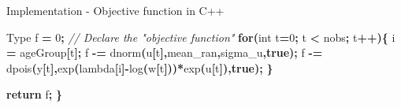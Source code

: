 \documentclass[aspectratio=169]{beamer}
\newenvironment{Shaded}{\begin{snugshade}}{\end{snugshade}}
\newcommand{\CommentTok}[1]{\textcolor[rgb]{0.56,0.35,0.01}{\textit{#1}}}
\newcommand{\ControlFlowTok}[1]{\textcolor[rgb]{0.13,0.29,0.53}{\textbf{#1}}}
\newcommand{\DataTypeTok}[1]{\textcolor[rgb]{0.13,0.29,0.53}{#1}}
\newcommand{\DecValTok}[1]{\textcolor[rgb]{0.00,0.00,0.81}{#1}}
\newcommand{\KeywordTok}[1]{\textcolor[rgb]{0.13,0.29,0.53}{\textbf{#1}}}
\newcommand{\NormalTok}[1]{#1}
\newcommand{\OperatorTok}[1]{\textcolor[rgb]{0.81,0.36,0.00}{\textbf{#1}}}
\begin{document}
\begin{frame}[fragile]{Implementation - Objective function in C++}
\begin{Shaded}
\begin{Highlighting}[]
\NormalTok{  Type f }\OperatorTok{=} \DecValTok{0}\OperatorTok{;}                           \CommentTok{// Declare the "objective function"}
  \ControlFlowTok{for}\OperatorTok{(}\DataTypeTok{int}\NormalTok{ t}\OperatorTok{=}\DecValTok{0}\OperatorTok{;}\NormalTok{ t }\OperatorTok{\textless{}}\NormalTok{ nobs}\OperatorTok{;}\NormalTok{ t}\OperatorTok{++)\{}
\NormalTok{    i }\OperatorTok{=}\NormalTok{ ageGroup}\OperatorTok{[}\NormalTok{t}\OperatorTok{];}
\NormalTok{    f }\OperatorTok{{-}=}\NormalTok{ dnorm}\OperatorTok{(}\NormalTok{u}\OperatorTok{[}\NormalTok{t}\OperatorTok{],}\NormalTok{mean\_ran}\OperatorTok{,}\NormalTok{sigma\_u}\OperatorTok{,}\KeywordTok{true}\OperatorTok{);}
\NormalTok{    f }\OperatorTok{{-}=}\NormalTok{ dpois}\OperatorTok{(}\NormalTok{y}\OperatorTok{[}\NormalTok{t}\OperatorTok{],}\NormalTok{exp}\OperatorTok{(}\NormalTok{lambda}\OperatorTok{[}\NormalTok{i}\OperatorTok{]{-}}\NormalTok{log}\OperatorTok{(}\NormalTok{w}\OperatorTok{[}\NormalTok{t}\OperatorTok{]))*}\NormalTok{exp}\OperatorTok{(}\NormalTok{u}\OperatorTok{[}\NormalTok{t}\OperatorTok{]),}\KeywordTok{true}\OperatorTok{);}
  \OperatorTok{\}}
  
  \ControlFlowTok{return}\NormalTok{ f}\OperatorTok{;}
\OperatorTok{\}}
\end{Highlighting}
\end{Shaded}

\normalsize
\end{frame}
\end{document}
